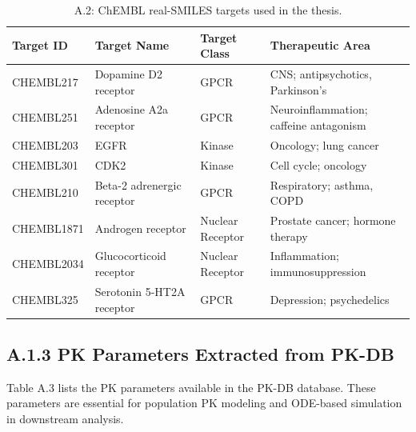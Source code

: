 \documentclass[a4paper,11pt,twoside]{report}
\begin{document}
\begin{table}[htbp]
\centering
\small
\caption{A.2: ChEMBL real-SMILES targets used in the thesis.}
\label{tab:chembl_targets}
\begin{tabular}{p{1.8cm}|p{3.2cm}|p{2.4cm}|p{3.0cm}}
\hline
\textbf{Target ID} & \textbf{Target Name} & \textbf{Target Class} & \textbf{Therapeutic Area} \\
\hline
CHEMBL217 & Dopamine D2 receptor & GPCR & CNS; antipsychotics, Parkinson's \\
CHEMBL251 & Adenosine A2a receptor & GPCR & Neuroinflammation; caffeine antagonism \\
CHEMBL203 & EGFR & Kinase & Oncology; lung cancer \\
CHEMBL301 & CDK2 & Kinase & Cell cycle; oncology \\
CHEMBL210 & Beta-2 adrenergic receptor & GPCR & Respiratory; asthma, COPD \\
CHEMBL1871 & Androgen receptor & Nuclear Receptor & Prostate cancer; hormone therapy \\
CHEMBL2034 & Glucocorticoid receptor & Nuclear Receptor & Inflammation; immunosuppression \\
CHEMBL325 & Serotonin 5-HT2A receptor & GPCR & Depression; psychedelics \\
\hline
\end{tabular}
\end{table}

\subsection*{A.1.3 PK Parameters Extracted from PK-DB}

Table A.3 lists the PK parameters available in the PK-DB database. These parameters are essential for population PK modeling and ODE-based simulation in downstream analysis.
\end{document}

